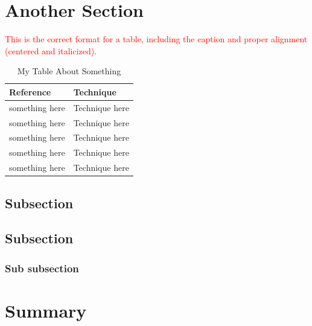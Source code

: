 \lipsum[1]

  

\section{Another Section}

 
\lipsum[1]

\textcolor{red}{This is the correct format for a table, including the caption and proper alignment (centered and italicized).}

\begin{table}[H]
\centering
\captionsetup{
    labelfont=bf, 
    textfont=it,  
    justification=centering
}
\caption{My Table About Something}
\label{tab:sampling-techniques}
\begin{tabularx}{\textwidth}{@{}X X@{}}
\toprule
\rowcolor[gray]{0.95} %
\textbf{Reference} & \textbf{Technique} \\
\midrule
something here & Technique here \\
something here & Technique here\\
something here  & Technique here \\
something here  & Technique here\\
something here  & Technique here \\
\bottomrule
\end{tabularx}
\end{table}
 

\subsection{Subsection}
 
\lipsum[1]
 
\subsection{Subsection}
\lipsum[1]
 
 
\subsubsection{Sub subsection}
 
\lipsum[1]

 
 
\section{Summary}

\lipsum[1]